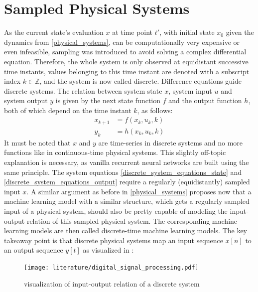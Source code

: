 \documentclass[draft,final]{vutinfth} %
\begin{document}
\section{Sampled Physical Systems} \label{sampled_physical_systems}
As the current state's evaluation $x$ at time point $t'$, with initial state $x_0$ given the dynamics from \ref{physical_systems}, can be computationally very expensive or even infeasible, sampling was introduced to avoid solving a complex differential equation.
Therefore, the whole system is only observed at equidistant successive time instants, values belonging to this time instant are denoted with a subscript index $k \in \mathbb{Z}$, and the system is now called discrete.
Difference equations guide discrete systems. The relation between system state $x$, system input $u$ and system output $y$ is given by the next state function $f$ and the output function $h$, both of which depend on the time instant $k$, as follows:
\begin{align}
\label{discrete_system_equations_state}
x_{k+1} &= f(x_k,u_k,k) \\
\label{discrete_system_equations_output}
y_k &= h(x_k,u_k,k)
\end{align}
It must be noted that $x$ and $y$ are time-series in discrete systems and no more functions like in continuous-time physical systems.
This slightly off-topic explanation is necessary, as vanilla recurrent neural networks are built using the same principle.
The system equations \ref{discrete_system_equations_state} and \ref{discrete_system_equations_output} require a regularly (equidistantly) sampled input $x$.
A similar argument as before in \ref{physical_systems} proposes now that a machine learning model with a similar structure, which gets a regularly sampled input of a physical system, should also be pretty capable of modeling the input-output relation of this sampled physical system.
The corresponding machine learning models are then called discrete-time machine learning models.
The key takeaway point is that discrete physical systems map an input sequence $x[n]$ to an output sequence $y[t]$ as visualized in \cite[p. 102]{dsp}:
\begin{figure}[H]
\centering{}
\texttt{[image: literature/digital\_signal\_processing.pdf]}
\caption{visualization of input-output relation of a discrete system}
\label{fig:discrete_system_vis}
\end{figure}
\end{document}
